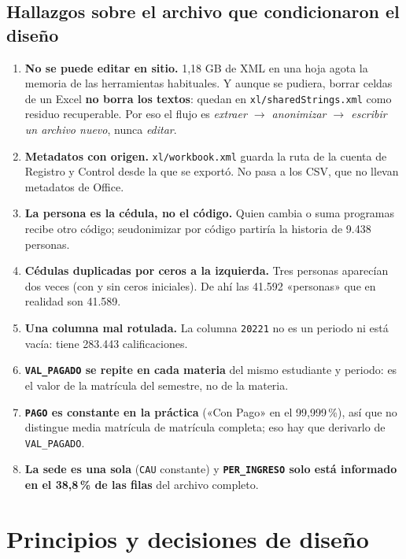 \documentclass[11pt,a4paper,twoside,twocolumn]{article}
\newcommand{\cod}[1]{\nolinkurl{#1}}
\begin{document}
\subsection{Hallazgos sobre el archivo que condicionaron el diseño}

\begin{enumerate}[leftmargin=*,itemsep=2pt,topsep=0pt]
  \item \textbf{No se puede editar en sitio.} 1,18 GB de XML en una hoja agota la memoria de las
  herramientas habituales. Y aunque se pudiera, borrar celdas de un Excel \textbf{no borra los
  textos}: quedan en \cod{xl/sharedStrings.xml} como residuo recuperable. Por eso el flujo es
  \emph{extraer $\to$ anonimizar $\to$ escribir un archivo nuevo}, nunca \emph{editar}.
  \item \textbf{Metadatos con origen.} \cod{xl/workbook.xml} guarda la ruta de la cuenta de
  Registro y Control desde la que se exportó. No pasa a los CSV, que no llevan metadatos de
  Office.
  \item \textbf{La persona es la cédula, no el código.} Quien cambia o suma programas recibe otro
  código; seudonimizar por código partiría la historia de 9.438 personas.
  \item \textbf{Cédulas duplicadas por ceros a la izquierda.} Tres personas aparecían dos veces
  (con y sin ceros iniciales). De ahí las 41.592 «personas» que en realidad son 41.589.
  \item \textbf{Una columna mal rotulada.} La columna \cod{20221} no es un periodo ni está vacía:
  tiene 283.443 calificaciones.
  \item \textbf{\cod{VAL_PAGADO} se repite en cada materia} del mismo estudiante y periodo: es el
  valor de la matrícula del semestre, no de la materia.
  \item \textbf{\cod{PAGO} es constante en la práctica} («Con Pago» en el 99,999\,\%), así que no
  distingue media matrícula de matrícula completa; eso hay que derivarlo de \cod{VAL_PAGADO}.
  \item \textbf{La sede es una sola} (\cod{CAU} constante) y \textbf{\cod{PER_INGRESO} solo está
  informado en el 38,8\,\% de las filas} del archivo completo.
\end{enumerate}

\section{Principios y decisiones de diseño}\label{sec:decisiones}
\end{document}
